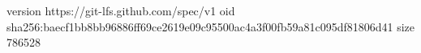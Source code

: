 version https://git-lfs.github.com/spec/v1
oid sha256:baecf1bb8bb96886ff69ce2619e09c95500ac4a3f00fb59a81c095df81806d41
size 786528
